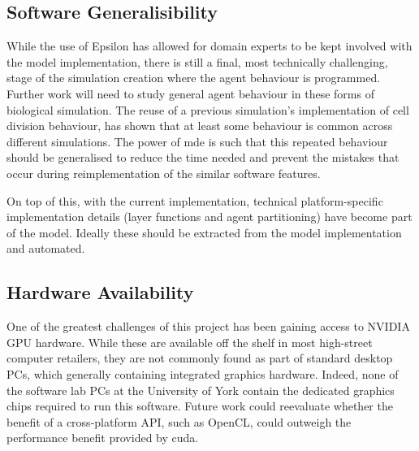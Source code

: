 \documentclass{UoYCSproject}
\begin{document}


\subsection{Software Generalisibility}%
While the use of Epsilon has allowed for domain experts to be kept involved with the model implementation, there is still a final, most technically challenging, stage of the simulation creation where the agent behaviour is programmed.
Further work will need to study general agent behaviour in these forms of biological simulation.
The reuse of a previous simulation's implementation of cell division behaviour, has shown that at least some behaviour is common across different simulations.
The power of \gls{mde} is such that this repeated behaviour should be generalised to reduce the time needed and prevent the mistakes that occur during reimplementation of the similar software features.

On top of this, with the current implementation, technical platform-specific implementation details (layer functions and agent partitioning) have become part of the model.
Ideally these should be extracted from the model implementation and automated.

\subsection{Hardware Availability}
One of the greatest challenges of this project has been gaining access to NVIDIA GPU hardware.
While these are available off the shelf in most high-street computer retailers, they are not commonly found as part of standard desktop PCs, which generally containing integrated graphics hardware.
Indeed, none of the software lab PCs at the University of York contain the dedicated graphics chips required to run this software.
Future work could reevaluate whether the benefit of a cross-platform API, such as OpenCL, could outweigh the performance benefit provided by \acrshort{cuda}.
\end{document}
